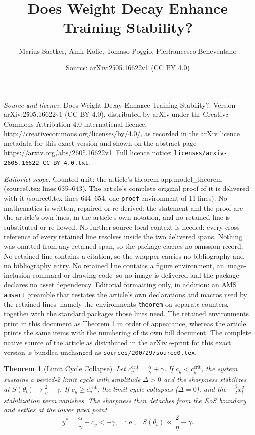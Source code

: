 \documentclass[10pt,a4paper]{amsart}
\title{Does Weight Decay Enhance Training Stability?}
\author{Marius Saether, Amir Kolic, Tomaso Poggio, Pierfrancesco Beneventano}
\date{Source: arXiv:2605.16622v1 (CC BY 4.0)}
\newtheorem{theorem}{Theorem}
\begin{document}
\maketitle

\noindent\emph{Source and licence.} Does Weight Decay Enhance Training Stability?. Version arXiv:2605.16622v1 (CC BY 4.0), distributed by arXiv under the Creative Commons Attribution 4.0 International licence, http://creativecommons.org/licenses/by/4.0/, as recorded in the arXiv licence metadata for this exact version and shown on the abstract page https://arxiv.org/abs/2605.16622v1. Full licence notice: \texttt{licenses/arxiv-2605.16622-CC-BY-4.0.txt}.\par\smallskip

\noindent\textit{Editorial scope.} Counted unit: the article's theorem app:model\_theorem (source0.tex lines 635--643). The article's complete original proof of it is delivered with it (source0.tex lines 644--654, one \texttt{proof} environment of 11 lines). No mathematics is written, repaired or re-derived: the statement and the proof are the article's own lines, in the article's own notation, and no retained line is substituted or re-flowed.  No further source-local context is needed: every cross-reference of every retained line resolves inside the two delivered spans.  Nothing was omitted from any retained span, so the package carries no omission record.  No retained line contains a citation, so the wrapper carries no bibliography and no bibliography entry.  No retained line contains a figure environment, an image-inclusion command or drawing code, so no image is delivered and the package declares no asset dependency.  Editorial formatting only, in addition: an AMS \texttt{amsart} preamble that restates the article's own declarations and macros used by the retained lines, namely the environments \texttt{theorem} on separate counters, together with the standard packages those lines need.  The retained environments print in this document as Theorem 1 in order of appearance, whereas the article prints the same items with the numbering of its own full document.  The complete native source of the article as distributed in the arXiv e-print for this exact version is bundled unchanged as \texttt{sources/200729/source0.tex}.
\begin{theorem}[Limit Cycle Collapse]
\label{app:model_theorem}
Let $c_y^{\mathrm{crit}} = \frac{\alpha}{\gamma} + \gamma$. If $c_y < c_y^{\mathrm{crit}}$, the system sustains a period-2 limit cycle with amplitude $\Delta > 0$ and the sharpness stabilizes at $S(\theta_t) \to \frac{2}{\eta} - \gamma$. If $c_y \geq c_y^{\mathrm{crit}}$, the limit cycle collapses ($\Delta = 0$), and the $-\frac{\beta}{2}x_t^2$ stabilization term vanishes. The sharpness then detaches from the EoS boundary and settles at the lower fixed point
\[
    y^* = \frac{\alpha}{\gamma} - c_y < -\gamma,
    \quad\text{i.e.,}\quad
    S(\theta_t) \ll \frac{2}{\eta} - \gamma.
\]
\end{theorem}
\end{document}

